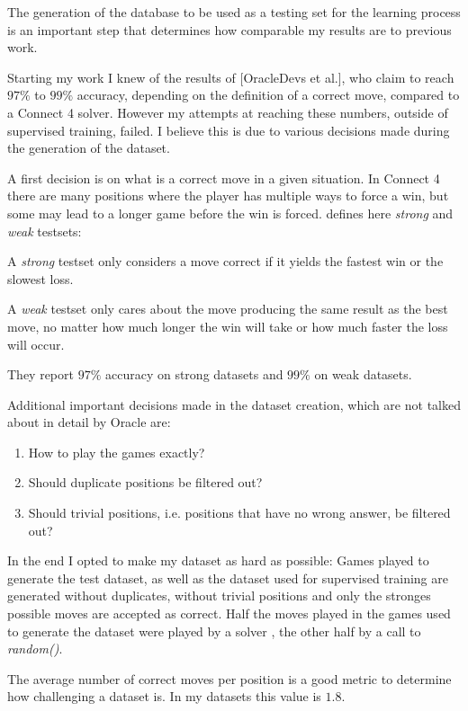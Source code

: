 \documentclass[12pt,onecolumn,oneside,titlepage]{article}
\begin{document}
The generation of the database to be used as a testing set for the learning process is an important step that determines how comparable my results are to previous work. 

Starting my work I knew of the results of \cite{oracledevs}[OracleDevs et al.],
who claim to reach $97\%$ to $99\%$ accuracy, depending on the definition of a correct move, compared to a Connect 4 solver. However my attempts at reaching these numbers, outside of supervised training, failed. I believe this is due to various decisions made during the generation of the dataset.

A first decision is on what is a correct move in a given situation. In Connect 4 there are many positions where the player has multiple ways to force a win, but some may lead to a longer game before the win is forced.
\cite{oracledevs} defines here \emph{strong} and \emph{weak} testsets: 

A \emph{strong} testset only considers a move correct if it yields the fastest win or the slowest loss. 

A \emph{weak} testset only cares about the move producing the same result 
as the best move, no matter how much longer the win will take or how much faster the loss will occur.

They report $97\%$ accuracy on strong datasets and $99\%$ on weak datasets.

Additional important decisions made in the dataset creation, which are not talked about in detail by Oracle are:

\begin{enumerate}
 \item How to play the games exactly?
 \item Should duplicate positions be filtered out?
 \item Should trivial positions, i.e. positions that have no wrong answer, be filtered out?
\end{enumerate}

In the end I opted to make my dataset as hard as possible: Games played to generate the test dataset, as well as the dataset used for supervised training are generated without duplicates, without trivial positions and only the stronges possible moves are accepted as correct.
Half the moves played in the games used to generate the dataset were played by a solver \cite{pascalsolver, pascalsolvergithub}, the other half by a call to \emph{random()}.

The average number of correct moves per position is a good metric to determine how challenging a dataset is. In my datasets this value is $1.8$.
\end{document}
